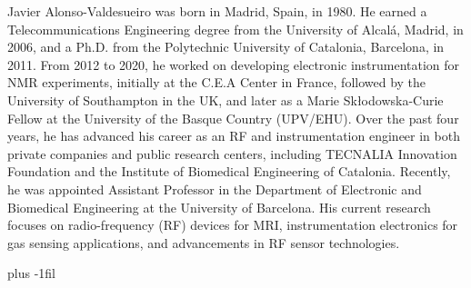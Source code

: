\documentclass[journal,twoside,web]{ieeecolor}
\begin{document}
\begin{IEEEbiography}{Javier Alonso-Valdesueiro}
was born in Madrid, Spain, in 1980. He earned a Telecommunications Engineering degree from the University of Alcalá, Madrid, in 2006, and a Ph.D. from the Polytechnic University of Catalonia, Barcelona, in 2011. From 2012 to 2020, he worked on developing electronic instrumentation for NMR experiments, initially at the C.E.A Center in France, followed by the University of Southampton in the UK, and later as a Marie Skłodowska-Curie Fellow at the University of the Basque Country (UPV/EHU). Over the past four years, he has advanced his career as an RF and instrumentation engineer in both private companies and public research centers, including TECNALIA Innovation Foundation and the Institute of Biomedical Engineering of Catalonia. Recently, he was appointed Assistant Professor in the Department of Electronic and Biomedical Engineering at the University of Barcelona. His current research focuses on radio-frequency (RF) devices for MRI, instrumentation electronics for gas sensing applications, and advancements in RF sensor technologies.
\end{IEEEbiography}
\baselineskip plus -1fil
\end{document}
